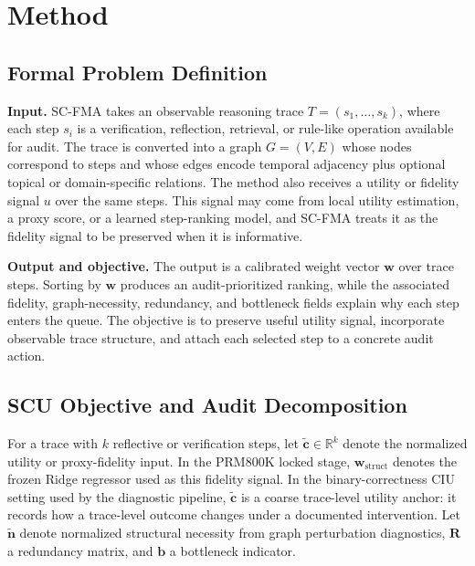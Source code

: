 \documentclass[a4paper,fleqn]{cas-sc}
\newcommand{\wstruct}{\ensuremath{\mathbf{w}_{\mathrm{struct}}}}
\begin{document}
\section{Method}
\label{sec:methods}

\subsection{Formal Problem Definition}

\textbf{Input.} SC-FMA takes an observable reasoning trace $T=(s_1,\ldots,s_k)$, where each step $s_i$ is a verification, reflection, retrieval, or rule-like operation available for audit. The trace is converted into a graph $G=(V,E)$ whose nodes correspond to steps and whose edges encode temporal adjacency plus optional topical or domain-specific relations. The method also receives a utility or fidelity signal $u$ over the same steps. This signal may come from local utility estimation, a proxy score, or a learned step-ranking model, and SC-FMA treats it as the fidelity signal to be preserved when it is informative.

\textbf{Output and objective.} The output is a calibrated weight vector $\mathbf{w}$ over trace steps. Sorting by $\mathbf{w}$ produces an audit-prioritized ranking, while the associated fidelity, graph-necessity, redundancy, and bottleneck fields explain why each step enters the queue. The objective is to preserve useful utility signal, incorporate observable trace structure, and attach each selected step to a concrete audit action.

\subsection{SCU Objective and Audit Decomposition}
\label{sec:scu-objective}

For a trace with $k$ reflective or verification steps, let $\tilde{\mathbf{c}}\in\mathbb{R}^k$ denote the normalized utility or proxy-fidelity input. In the PRM800K locked stage, \wstruct{} denotes the frozen Ridge regressor used as this fidelity signal. In the binary-correctness CIU setting used by the diagnostic pipeline, $\tilde{\mathbf{c}}$ is a coarse trace-level utility anchor: it records how a trace-level outcome changes under a documented intervention. Let $\tilde{\mathbf{n}}$ denote normalized structural necessity from graph perturbation diagnostics, $\mathbf{R}$ a redundancy matrix, and $\mathbf{b}$ a bottleneck indicator.
\end{document}
